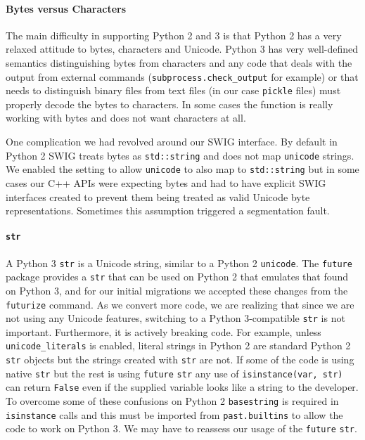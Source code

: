 \documentclass[11pt,twoside]{article}
\begin{document}
\paragraph{Bytes versus Characters}

The main difficulty in supporting Python 2 and 3 is that Python 2 has a very relaxed attitude to bytes, characters and Unicode.
Python 3 has very well-defined semantics distinguishing bytes from characters and any code that deals with the output from external commands (\texttt{subprocess.check\_output} for example) or that needs to distinguish binary files from text files (in our case \texttt{pickle} files) must properly decode the bytes to characters.
In some cases the function is really working with bytes and does not want characters at all.

One complication we had revolved around our SWIG \citep{beazley2003automated} interface.
By default in Python 2 SWIG treats bytes as \texttt{std::string} and does not map \texttt{unicode} strings.
We enabled the setting to allow \texttt{unicode} to also map to \texttt{std::string} but in some cases our C++ APIs were expecting bytes and had to have explicit SWIG interfaces created to prevent them being treated as valid Unicode byte representations.
Sometimes this assumption triggered a segmentation fault.

\paragraph{\texttt{str}}

A Python 3 \texttt{str} is a Unicode string, similar to a Python 2 \texttt{unicode}.
The \texttt{future} package provides a \texttt{str} that can be used on Python 2 that emulates that found on Python 3, and for our initial migrations we accepted these changes from the \texttt{futurize} command.
As we convert more code, we are realizing that since we are not using any Unicode features, switching to a Python 3-compatible \texttt{str} is not important.
Furthermore, it is actively breaking code.
For example, unless \texttt{unicode\_literals} is enabled, literal strings in Python 2 are standard Python 2 \texttt{str} objects but the strings created with \texttt{str} are not.
If some of the code is using native \texttt{str} but the rest is using \texttt{future} \texttt{str} any use of \texttt{isinstance(var, str)} can return \texttt{False} even if the supplied variable looks like a string to the developer.
To overcome some of these confusions on Python 2 \texttt{basestring} is required in \texttt{isinstance} calls and this must be imported from \texttt{past.builtins} to allow the code to work on Python 3.
We may have to reassess our usage of the \texttt{future} \texttt{str}.
\end{document}

